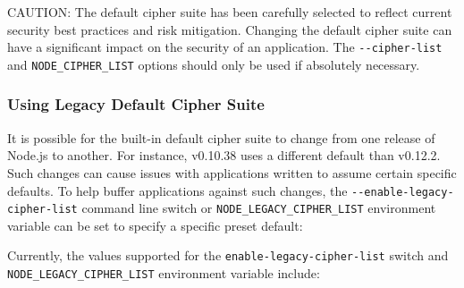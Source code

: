 CAUTION: The default cipher suite has been carefully selected to reflect
current security best practices and risk mitigation. Changing the
default cipher suite can have a significant impact on the security of an
application. The \texttt{-\/-cipher-list} and
\texttt{NODE\_CIPHER\_LIST} options should only be used if absolutely
necessary.

\subsubsection{Using Legacy Default Cipher
Suite}\label{using-legacy-default-cipher-suite}

It is possible for the built-in default cipher suite to change from one
release of Node.js to another. For instance, v0.10.38 uses a different
default than v0.12.2. Such changes can cause issues with applications
written to assume certain specific defaults. To help buffer applications
against such changes, the \texttt{-\/-enable-legacy-cipher-list} command
line switch or \texttt{NODE\_LEGACY\_CIPHER\_LIST} environment variable
can be set to specify a specific preset default:

\begin{Shaded}
\begin{Highlighting}[]
 

 
\end{Highlighting}
\end{Shaded}

Currently, the values supported for the
\texttt{enable-legacy-cipher-list} switch and
\texttt{NODE\_LEGACY\_CIPHER\_LIST} environment variable include:


